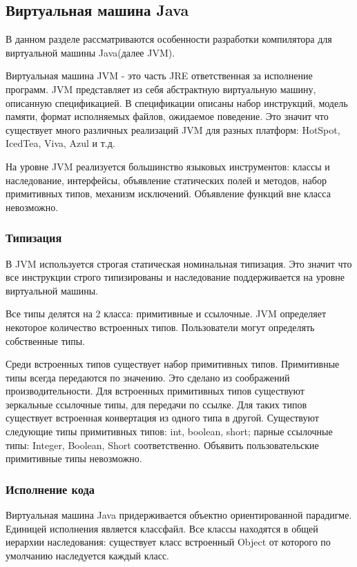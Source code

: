 \subsection{Виртуальная машина Java}
В данном разделе рассматриваются особенности разработки компилятора для виртуальной машины Java(далее JVM).

Виртуальная машина JVM - это часть JRE ответственная за исполнение программ. JVM представляет из себя абстрактную виртуальную машину, описанную спецификацией\cite{jvm:specification}. В спецификации описаны набор инструкций, модель памяти, формат исполняемых файлов, ожидаемое поведение. Это значит что существует много различных реализаций JVM для разных платформ: HotSpot, IcedTea, Viva, Azul и т.д.

На уровне JVM реализуется большинство языковых инструментов: классы и наследование, интерфейсы, объявление статических полей и методов, набор примитивных типов, механизм исключений. Объявление функций вне класса невозможно.

\subsubsection{Типизация}
В JVM используется строгая статическая номинальная типизация. Это значит что все инструкции строго типизированы и наследование поддерживается на уровне виртуальной машины.

Все типы делятся на 2 класса: примитивные и ссылочные. JVM определяет некоторое количество встроенных типов. Пользователи могут определять собственные типы.

Среди встроенных типов существует набор примитивных типов. Примитивные типы всегда передаются по значению. Это сделано из соображений производительности. Для встроенных примитивных типов существуют зеркальные ссылочные типы, для передачи по ссылке. Для таких типов существует встроенная конвертация из одного типа в другой. Существуют следующие типы примитивных типов: int, boolean, short; парные ссылочные типы: Integer, Boolean, Short соответственно. Объявить пользовательские примитивные типы невозможно.

\subsubsection{Исполнение кода}
Виртуальная машина Java придерживается объектно ориентированной парадигме. Единицей исполнения является классфайл. Все классы находятся в общей иерархии наследования: существует класс встроенный Object от которого по умолчанию наследуется каждый класс.

